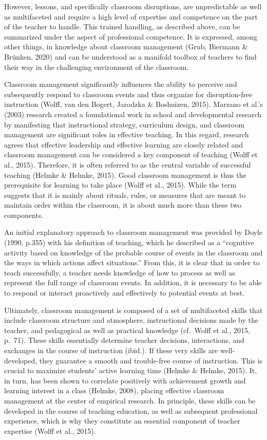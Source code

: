\documentclass[
  man]{apa6}
\begin{document}
However, lessons, and specifically classroom disruptions, are unpredictable as well as multifaceted and require a high level of expertise and competence on the part of the teacher to handle. This trained handling, as described above, can be summarized under the aspect of professional competence. It is expressed, among other things, in knowledge about classroom management (Grub, Biermann \& Brünken, 2020) and can be understood as a manifold toolbox of teachers to find their way in the challenging environment of the classroom.

Classroom management significantly influences the ability to perceive and subsequently respond to classroom events and thus organize for disruption-free instruction (Wolff, van den Bogert, Jarodzka \& Boshuizen, 2015). Marzano et al.'s (2003) research created a foundational work in school and developmental research by manifesting that instructional strategy, curriculum design, and classroom management are significant roles in effective teaching. In this regard, research agrees that effective leadership and effective learning are closely related and classroom management can be considered a key component of teaching (Wolff et al., 2015). Therefore, it is often referred to as the central variable of successful teaching (Helmke \& Helmke, 2015). Good classroom management is thus the prerequisite for learning to take place (Wolff et al., 2015). While the term suggests that it is mainly about rituals, rules, or measures that are meant to maintain order within the classroom, it is about much more than these two components.

An initial explanatory approach to classroom management was provided by Doyle (1990, p.355) with his definition of teaching, which he described as a ``cognitive activity based on knowledge of the probable course of events in the classroom and the ways in which actions affect situations.'' From this, it is clear that in order to teach successfully, a teacher needs knowledge of how to process as well as represent the full range of classroom events. In addition, it is necessary to be able to respond or interact proactively and effectively to potential events at best.

Ultimately, classroom management is composed of a set of multifaceted skills that include classroom structure and atmosphere, instructional decisions made by the teacher, and pedagogical as well as practical knowledge (cf.~Wolff et al., 2015, p.~71). These skills essentially determine teacher decisions, interactions, and exchanges in the course of instruction (ibid.). If these very skills are well-developed, they guarantee a smooth and trouble-free course of instruction. This is crucial to maximize students' active learning time (Helmke \& Helmke, 2015). It, in turn, has been shown to correlate positively with achievement growth and learning interest in a class (Helmke, 2008), placing effective classroom management at the center of empirical research. In principle, these skills can be developed in the course of teaching education, as well as subsequent professional experience, which is why they constitute an essential component of teacher expertise (Wolff et al., 2015).
\end{document}
